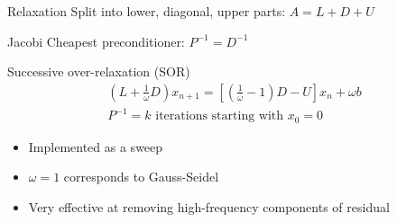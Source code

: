 \begin{frame}{Relaxation}
  Split into lower, diagonal, upper parts: \alert{$ A = L + D + U $}
  \begin{block}{Jacobi}
    Cheapest preconditioner: $P^{-1} = D^{-1}$
  \end{block}
  \begin{block}{Successive over-relaxation (SOR)}
    \begin{gather*}
      \left(L + \frac 1 \omega D\right) x_{n+1} = \left[\left(\frac
          1\omega-1\right)D - U\right] x_n + \omega b \\
      P^{-1} = \text{$k$ iterations starting with $x_0=0$}
    \end{gather*}
    \begin{itemize}
    \item Implemented as a sweep
    \item $\omega = 1$ corresponds to Gauss-Seidel
    \item Very effective at removing high-frequency components of residual
    \end{itemize}
  \end{block}
\end{frame}

